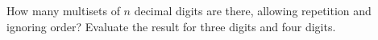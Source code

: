 How many multisets of $n$ decimal digits are there, allowing repetition and ignoring order? Evaluate the result for three digits and four digits.

